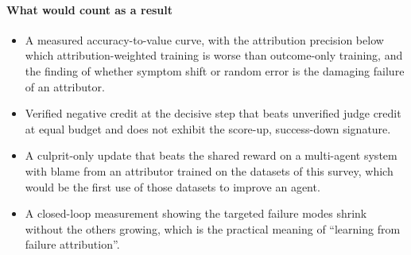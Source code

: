 \documentclass[10pt,a4paper]{article}
\begin{document}
\paragraph{What would count as a result}
\begin{itemize}[leftmargin=1.1em]
\item A measured accuracy-to-value curve, with the attribution precision below which attribution-weighted training is worse than outcome-only training, and the finding of whether symptom shift or random error is the damaging failure of an attributor.
\item Verified negative credit at the decisive step that beats unverified judge credit at equal budget and does not exhibit the score-up, success-down signature.
\item A culprit-only update that beats the shared reward on a multi-agent system with blame from an attributor trained on the datasets of this survey, which would be the first use of those datasets to improve an agent.
\item A closed-loop measurement showing the targeted failure modes shrink without the others growing, which is the practical meaning of ``learning from failure attribution''.
\end{itemize}

\clearpage

\end{document}
